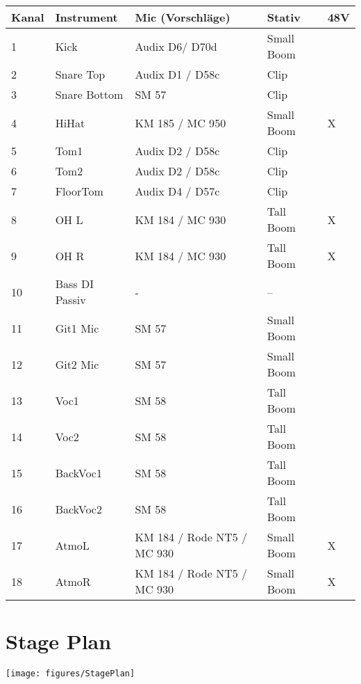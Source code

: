 \documentclass{article}
\begin{document}
  \begin{tabular}{|l|l|l|l|l|}
  \hline
  \textbf{Kanal} & \textbf{Instrument} & \textbf{Mic (Vorschläge)} & \textbf{Stativ} & \textbf{48V}\\
  \hline
  1  & Kick           & Audix D6/ D70d             & Small Boom &   \\
  2  & Snare Top      & Audix D1 / D58c            & Clip       &   \\
  3  & Snare Bottom   & SM 57                      & Clip       &   \\
  4  & HiHat          & KM 185 / MC 950            & Small Boom & X \\
  5  & Tom1           & Audix D2 / D58c            & Clip       &   \\
  6  & Tom2           & Audix D2 / D58c            & Clip       &   \\
  7  & FloorTom       & Audix D4 / D57c            & Clip       &   \\
  8  & OH L           & KM 184 / MC 930            & Tall Boom  & X \\
  9  & OH R           & KM 184 / MC 930            & Tall Boom  & X \\
  10 & Bass DI Passiv & -                          & --         &   \\
  11 & Git1 Mic       & SM 57                      & Small Boom &   \\
  12 & Git2 Mic       & SM 57                      & Small Boom &   \\
  13 & Voc1           & SM 58                      & Tall Boom  &   \\
  14 & Voc2           & SM 58                      & Tall Boom  &   \\
  15 & BackVoc1       & SM 58                      & Tall Boom  &   \\
  16 & BackVoc2       & SM 58                      & Tall Boom  &   \\
  17 & AtmoL          & KM 184 / Rode NT5 / MC 930 & Small Boom & X \\
  18 & AtmoR          & KM 184 / Rode NT5 / MC 930 & Small Boom & X \\
  \hline
  \end{tabular}

  \section*{Stage Plan}

  \texttt{[image: figures/StagePlan]}
\end{document}
